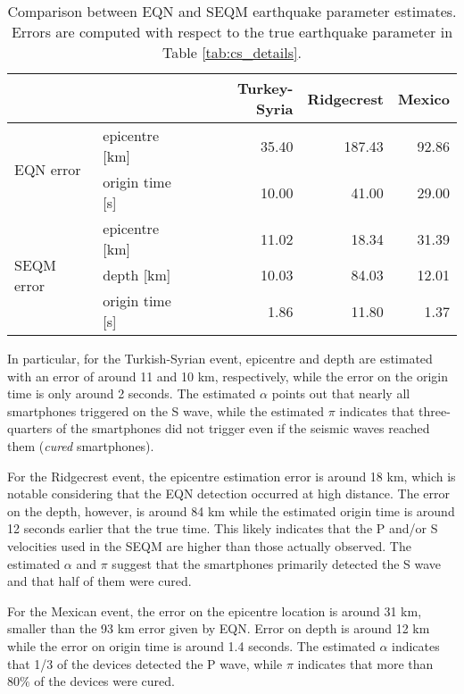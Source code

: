 \documentclass[final]{statsoc}
\begin{document}
\begin{table}
    \caption{\label{tab:comparison} Comparison between EQN and SEQM earthquake parameter estimates. Errors are computed with respect to the true earthquake parameter in Table \ref{tab:cs_details}.}
    \centering
    \begin{tabular}{l|lrrr}
    &  & Turkey-Syria & Ridgecrest & Mexico \\ \hline
    \multirow{2}{*}{EQN error} & epicentre [km] & \multicolumn{1}{r}{35.40} & 
    \multicolumn{1}{r}{187.43} & \multicolumn{1}{r}{92.86} \\ 
    & origin time [s] & \multicolumn{1}{r}{10.00} & \multicolumn{1}{r}{41.00} & 
    \multicolumn{1}{r}{29.00} \\ \hline
    \multirow{3}{*}{SEQM error} & epicentre [km] & \multicolumn{1}{r}{11.02} & 
    \multicolumn{1}{r}{18.34} & \multicolumn{1}{r}{31.39} \\ 
    & depth [km] & \multicolumn{1}{r}{10.03} & \multicolumn{1}{r}{84.03} & 
    \multicolumn{1}{r}{12.01} \\ 
    & origin time [s] & \multicolumn{1}{r}{1.86} & \multicolumn{1}{r}{11.80} & 
    \multicolumn{1}{r}{1.37}%
    \end{tabular}
\end{table}

In particular, for the Turkish-Syrian event, epicentre and depth are estimated with an error of around 11 and 10 km, respectively, while the error on the origin time is only around 2 seconds. The estimated $\alpha$ points out that nearly all smartphones triggered on the S wave, while the estimated $\pi$ indicates that three-quarters of the smartphones did not trigger even if the seismic waves reached them (\emph{cured} smartphones).

For the Ridgecrest event, the epicentre estimation error is around 18 km, which is notable considering that the EQN detection occurred at high distance. The error on the depth, however, is around 84 km while the estimated origin time is around 12 seconds earlier that the true time. This likely indicates that the P and/or S velocities used in the SEQM are higher than those actually observed. The estimated $\alpha$ and $\pi$ suggest that the smartphones primarily detected the S wave and that half of them were cured.

For the Mexican event, the error on the epicentre location is around 31 km, smaller than the 93 km error given by EQN. Error on depth is around 12 km while the error on origin time is around 1.4 seconds. The estimated $\alpha$ indicates that 1/3 of the devices detected the P wave, while $\pi$ indicates that more than $80\%$ of the devices were cured.
\end{document}
